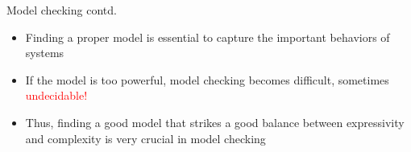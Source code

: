 \documentclass{beamer}
\begin{document}
  \begin{frame}{Model checking contd.}
  \begin{itemize}
      \item Finding a proper model is essential to capture the important behaviors of systems
      \item If the model is too powerful, model checking becomes difficult, sometimes \textcolor{red}{undecidable!}
      \item Thus, finding a good model that strikes a good balance between expressivity and complexity is very crucial in model checking
      
  \end{itemize}
  \end{frame}

        
\end{document}
